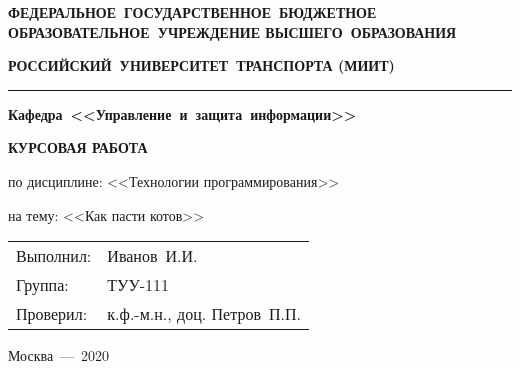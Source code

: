 \begin{titlepage}

	\centering
	{\normalsize \bfseries ФЕДЕРАЛЬНОЕ~ГОСУДАРСТВЕННОЕ~БЮДЖЕТНОЕ ОБРАЗОВАТЕЛЬНОЕ~УЧРЕЖДЕНИЕ ВЫСШЕГО~ОБРАЗОВАНИЯ\par}
	
	\vspace{1cm}

	{\normalsize \bfseries РОССИЙСКИЙ~УНИВЕРСИТЕТ~ТРАНСПОРТА (МИИТ) \par}

	\vspace{0.5cm}

	\noindent\rule{12cm}{0.4pt}

    \vspace{1cm}
    
	{\normalsize \bfseries Кафедра~<<Управление~и~защита~информации>> \par}

	\vspace{4cm}


    {\Large \bfseries КУРСОВАЯ РАБОТА\par}
    {\large по дисциплине: <<Технологии программирования>> \par}
    {\large на тему: <<Как пасти котов>> \par}

    \vfill

    \begin{flushright}
        \begin{tabular}{l l}
            {\normalsize Выполнил: } & {\normalsize Иванов~И.И. } \\
            {\normalsize Группа: }   & {\normalsize ТУУ-111 } \\
            {\normalsize Проверил: } & {\normalsize к.ф.-м.н., доц. Петров~П.П. } \\
        \end{tabular}
    \end{flushright}

    \vspace{\fill}
    
	{\normalsize Москва~---~2020\par}
	
\end{titlepage}